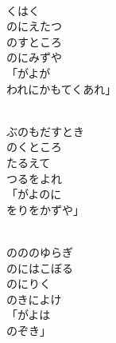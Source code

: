 \documentclass[10pt,b5j]{tarticle} %
\begin{document}
\vspace{1.5em} %
\newcommand{\linespace}{0.5em} %
\newcommand{\blocksize}{0.5\hsize} %
\newcommand{\itemmargin}{3em} %
\begin{enumerate} %
    \setlength{\itemindent}{\itemmargin} %
    \begin{minipage}[c]{\blocksize}
    
        \vspace{\linespace}
        \item~\\
        くはく\\
        のにえたつ\\
        のすところ\\
        のにみずや\\
        「がよが\\
        われにかもてくあれ」
        
    \end{minipage}
    \begin{minipage}[c]{\blocksize}
        
        \vspace{\linespace}
        \item~\\
        ぶのもだすとき\\
        のくところ\\
        たるえて\\
        つるをよれ\\
        「がよのに\\
        をりをかずや」
        
    \end{minipage}
    \begin{minipage}[c]{\blocksize}
        
        \vspace{\linespace}
        \item~\\
        のののゆらぎ\\
        のにはこぼる\\
        のにりく\\
        のきによけ\\
        「がよは\\
        のぞき」
        

\end{minipage}
\end{enumerate}
\end{document}

